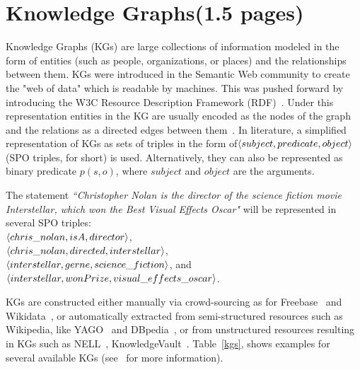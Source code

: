 \section{Knowledge Graphs(1.5 pages)}
\label{sec:kgs}
Knowledge Graphs (KGs) are large collections of information modeled in the form of entities (such as people, organizations, or places) and the relationships between them. KGs were introduced in the Semantic Web community to create the "web of data" which is readable by machines. This was pushed forward by introducing the W3C Resource Description Framework (RDF)~\cite{rdf2004}. Under this representation entities in the KG are usually encoded as the nodes of the graph and the relations as a directed edges between them~\cite{Nickel2015ARO}. In literature, a simplified representation of KGs as sets of triples in the form of$\langle subject, predicate,object\rangle$ (SPO triples, for short) is used. Alternatively, they can also be represented as binary predicate $p(s,o)$, where $subject$ and $object$ are the arguments. 

\begin{example}
The statement \textit{``Christopher Nolan is the director of the science fiction movie Interstellar, which won the Best Visual Effects Oscar"} will be represented in several SPO triples:\\
$\langle chris\_nolan, isA, director\rangle$,\\
$\langle chris\_nolan, directed, interstellar\rangle$,\\
$\langle interstellar, gerne, science\_fiction\rangle$, and \\
$\langle interstellar, wonPrize, visual\_effects\_oscar\rangle$.
\end{example}






 KGs are constructed either manually via crowd-sourcing as for \eg Freebase~\cite{Freebase} and Wikidata~\cite{wikidata}, or automatically extracted from semi-structured resources such as Wikipedia, like  YAGO~\cite{yago} and DBpedia~\cite{dbpedia}, or from unstructured resources resulting in KGs such as  NELL~\cite{NELL-aaai15}, KnowledgeVault~\cite{KnowledgeVault}. Table~\ref{kgs}, shows examples for several available KGs (see~\cite{Nickel2015ARO,DBLP:journals/semweb/Paulheim17} for more information).




\leanparagraph{}

